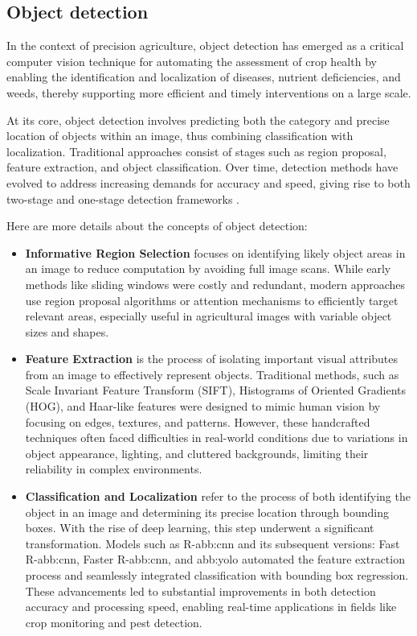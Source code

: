 

\subsection{Object detection}
In the context of precision agriculture, object detection has emerged as a critical computer vision technique for automating the assessment of crop health by enabling the identification and localization of diseases, nutrient deficiencies, and weeds, thereby supporting more efficient and timely interventions on a large scale.

At its core, object detection involves predicting both the category and precise location of objects within an image, thus combining classification with localization. Traditional approaches consist of stages such as region proposal, feature extraction, and object classification. Over time, detection methods have evolved to address increasing demands for accuracy and speed, giving rise to both two-stage and one-stage detection frameworks \parencite{zhao2019objectdetection}.

Here are more details about the concepts of object detection: 
\begin{itemize}
    \item \textbf{Informative Region Selection} focuses on identifying likely object areas in an image to reduce computation by avoiding full image scans. While early methods like sliding windows were costly and redundant, modern approaches use region proposal algorithms or attention mechanisms to efficiently target relevant areas, especially useful in agricultural images with variable object sizes and shapes.
    \item \textbf{Feature Extraction} is the process of isolating important visual attributes from an image to effectively represent objects. Traditional methods, such as Scale Invariant Feature Transform (SIFT), Histograms of Oriented Gradients (HOG), and Haar-like features were designed to mimic human vision by focusing on edges, textures, and patterns. However, these handcrafted techniques often faced difficulties in real-world conditions due to variations in object appearance, lighting, and cluttered backgrounds, limiting their reliability in complex environments.
    \item \textbf{Classification and Localization} refer to the process of both identifying the object in an image and determining its precise location through bounding boxes. With the rise of deep learning, this step underwent a significant transformation. Models such as R-\gls{abb:cnn} and its subsequent versions: Fast R-\gls{abb:cnn}, Faster R-\gls{abb:cnn}, and \gls{abb:yolo} automated the feature extraction process and seamlessly integrated classification with bounding box regression. These advancements led to substantial improvements in both detection accuracy and processing speed, enabling real-time applications in fields like crop monitoring and pest detection.
\end{itemize}

